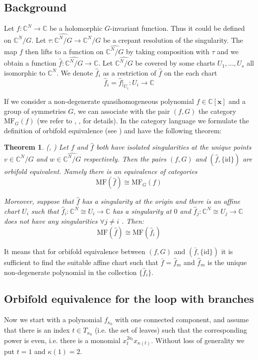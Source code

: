 \documentclass[reqno,12pt]{amsart}
\numberwithin{equation}{section}
\theoremstyle{plain}
\newtheorem{theorem}{Theorem}
\theoremstyle{definition}
\newcommand{\CC}{{\mathbb{C}}}
\newcommand{\id}{\mathrm{id}}
\begin{document}
\subsection{Background}

Let $f\colon \CC^N \to \CC$ be a holomorphic $G$-invariant function. Thus it could be defined on $\CC^N/G$. Let $\tau\colon \widehat{\CC^N/G} \to \CC^N/G$ be a crepant resolution of the
singularity. The map $f$ then lifts to a function on $\widehat{\CC^N/G}$ by taking composition with $\tau$ and we obtain a function $\hat{f}\colon \widehat{\CC^N/G}\to \CC$. Let $\widehat{\CC^N/G}$ be covered by some charts $U_1, \dots, U_s$ all isomorphic to $\CC^N$. We denote $\hat{f}_i$ as a restriction of $\hat{f}$ on the each chart 
\[\hat{f}_i = \hat{f}|_{U_i}\colon U_i \to \CC\]

If we consider a non-degenerate quasihomogeneous polynomial $f \in \CC[\textbf{x}]$ and a group of symmetries $G$, we can associate with the pair $(f,G)$ the category $\mathrm{MF}_G(f)$ (we refer to \cite{Orl1}, \cite{Orl2}, \cite{Io} for details). In the category language we formulate the definition of orbifold equivalence (see \cite{Io}) and have the following theorem:
\begin{theorem}\label{equiv}(\cite{BP}, \cite{Io})
    Let $f$ and $\hat{f}$ both have isolated singularities at the unique points $v \in \CC^N/G$ and $w \in \widehat{\CC^N/G}$ respectively. Then the pairs $(f,G)$ and $(\hat{f},\{\id\})$ are orbifold equivalent. Namely there is an equivalence of categories
$$\mathrm{MF}(\hat{f}) \cong\mathrm{MF}_G(f)$$

Moreover, suppose that $\hat{f}$ has a singularity at the origin and there is an affine chart $U_i$ such that $\hat{f}_i\colon \CC^N \cong U_i \to \CC$ has a singularity at $0$ and $\hat{f}_j\colon \CC^N \cong U_j\to \CC$ does not have any singularities $\forall j\neq i$ . Then:
$$\mathrm{MF}(\hat{f}) \cong \mathrm{MF}(\hat{f}_i)$$
\end{theorem}

It means that for orbifold equivalence between $(f, G)$ and $(\bar{f}, \{\id\})$ it is sufficient to find the suitable affine chart such that $\bar{f} = \hat{f}_m$ and $\hat{f}_m$ is the unique non-degenerate polynomial in the collection $\{\hat{f}_i\}$. 


\subsection{Orbifold equivalence for the loop with branches}
Now we start with a polynomial $f_{\kappa_0}$ with one connected component, and assume that there is an index $t \in T_{\kappa_0}$ (i.e. the set of leaves) such that the corresponding power is even, i.e. there is a monomial $x_t^{2a_t}x_{\kappa(t)}$. Without loss of generality we put $t=1$ and $\kappa(1)=2$.
\end{document}
